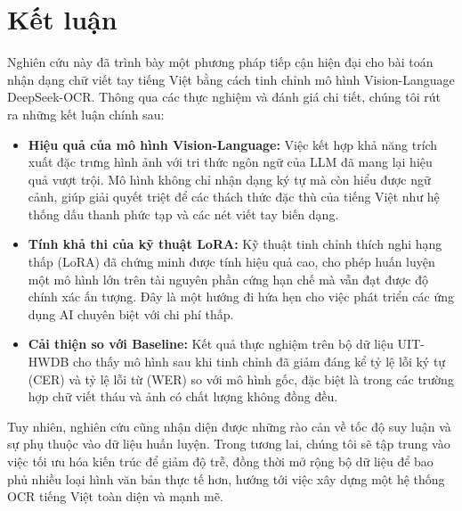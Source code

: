 \section{Kết luận}

Nghiên cứu này đã trình bày một phương pháp tiếp cận hiện đại cho bài toán nhận dạng chữ viết tay tiếng Việt bằng cách tinh chỉnh mô hình Vision-Language DeepSeek-OCR. Thông qua các thực nghiệm và đánh giá chi tiết, chúng tôi rút ra những kết luận chính sau:

\begin{itemize}
    \item \textbf{Hiệu quả của mô hình Vision-Language:} Việc kết hợp khả năng trích xuất đặc trưng hình ảnh với tri thức ngôn ngữ của LLM đã mang lại hiệu quả vượt trội. Mô hình không chỉ nhận dạng ký tự mà còn hiểu được ngữ cảnh, giúp giải quyết triệt để các thách thức đặc thù của tiếng Việt như hệ thống dấu thanh phức tạp và các nét viết tay biến dạng.
    
    \item \textbf{Tính khả thi của kỹ thuật LoRA:} Kỹ thuật tinh chỉnh thích nghi hạng thấp (LoRA) đã chứng minh được tính hiệu quả cao, cho phép huấn luyện một mô hình lớn trên tài nguyên phần cứng hạn chế mà vẫn đạt được độ chính xác ấn tượng. Đây là một hướng đi hứa hẹn cho việc phát triển các ứng dụng AI chuyên biệt với chi phí thấp.
    
    \item \textbf{Cải thiện so với Baseline:} Kết quả thực nghiệm trên bộ dữ liệu UIT-HWDB cho thấy mô hình sau khi tinh chỉnh đã giảm đáng kể tỷ lệ lỗi ký tự (CER) và tỷ lệ lỗi từ (WER) so với mô hình gốc, đặc biệt là trong các trường hợp chữ viết tháu và ảnh có chất lượng không đồng đều.
\end{itemize}

Tuy nhiên, nghiên cứu cũng nhận diện được những rào cản về tốc độ suy luận và sự phụ thuộc vào dữ liệu huấn luyện. Trong tương lai, chúng tôi sẽ tập trung vào việc tối ưu hóa kiến trúc để giảm độ trễ, đồng thời mở rộng bộ dữ liệu để bao phủ nhiều loại hình văn bản thực tế hơn, hướng tới việc xây dựng một hệ thống OCR tiếng Việt toàn diện và mạnh mẽ.
